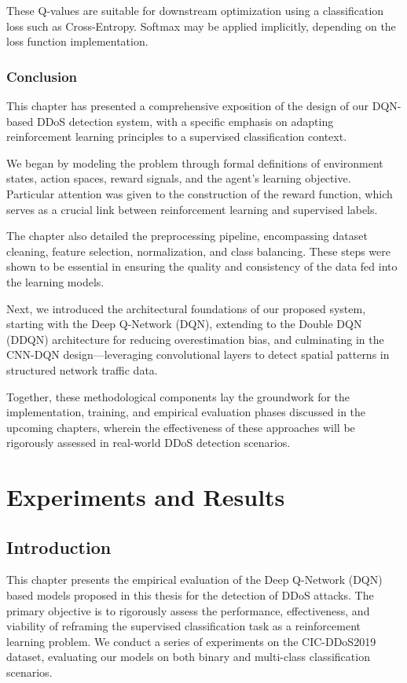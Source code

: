 \documentclass[16pt]{report}
\begin{document}
These Q-values are suitable for downstream optimization using a classification loss such as Cross-Entropy. Softmax may be applied implicitly, depending on the loss function implementation.

\subsection{Conclusion}

This chapter has presented a comprehensive exposition of the design of our DQN-based DDoS detection system, with a specific emphasis on adapting reinforcement learning principles to a supervised classification context. 

We began by modeling the problem through formal definitions of environment states, action spaces, reward signals, and the agent's learning objective. Particular attention was given to the construction of the reward function, which serves as a crucial link between reinforcement learning and supervised labels.

The chapter also detailed the preprocessing pipeline, encompassing dataset cleaning, feature selection, normalization, and class balancing. These steps were shown to be essential in ensuring the quality and consistency of the data fed into the learning models.

Next, we introduced the architectural foundations of our proposed system, starting with the Deep Q-Network (DQN), extending to the Double DQN (DDQN) architecture for reducing overestimation bias, and culminating in the CNN-DQN design—leveraging convolutional layers to detect spatial patterns in structured network traffic data.

Together, these methodological components lay the groundwork for the implementation, training, and empirical evaluation phases discussed in the upcoming chapters, wherein the effectiveness of these approaches will be rigorously assessed in real-world DDoS detection scenarios.



\chapter{Experiments and Results}
\label{chap:experiments}

\section{Introduction}
This chapter presents the empirical evaluation of the Deep Q-Network (DQN) based models proposed in this thesis for the detection of DDoS attacks. The primary objective is to rigorously assess the performance, effectiveness, and viability of reframing the supervised classification task as a reinforcement learning problem. We conduct a series of experiments on the CIC-DDoS2019 dataset, evaluating our models on both binary and multi-class classification scenarios.
\end{document}
